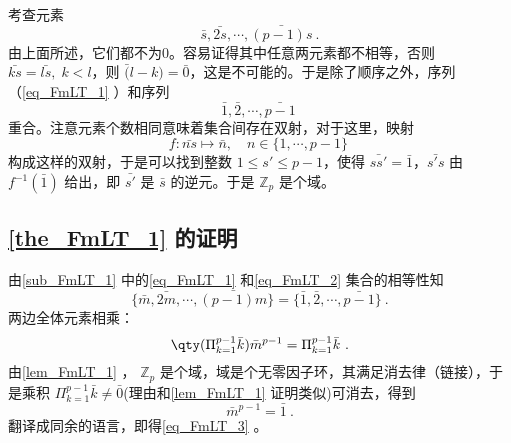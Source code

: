考查元素 
\begin{equation}\label{eq_FmLT_1}
\bar s,\bar{2s},\cdots,\bar{(p-1)s}~.
\end{equation}
由上面所述，它们都不为0。容易证得其中任意两元素都不相等，否则 $\bar {ks}=\bar{ls},\;k<l$，则 $\bar(l-k)=\bar 0$，这是不可能的。于是除了顺序之外，序列（\autoref{eq_FmLT_1} ）和序列
\begin{equation}\label{eq_FmLT_2}
\bar 1,\bar 2,\cdots,\bar{p-1}~
\end{equation}
重合。注意元素个数相同意味着集合间存在双射，对于这里，映射
\begin{equation}
f:\bar{ns}\mapsto \bar n,\quad n\in\{1,\cdots,p-1\}~
\end{equation}
构成这样的双射，于是可以找到整数 $1\leq s'\leq p-1$，使得 $\bar{ss'}=\bar 1$，$\bar{s's}$ 由 $f^{-1}(\bar 1)$ 给出，即 $\bar{s'}$ 是 $\bar s$ 的逆元。于是 $\mathbb Z_p$ 是个域。
\subsection{\autoref{the_FmLT_1} 的证明}
由\autoref{sub_FmLT_1} 中的\autoref{eq_FmLT_1} 和\autoref{eq_FmLT_2} 集合的相等性知
\begin{equation}
\{\bar m,\bar{2m},\cdots,\bar{(p-1)m}\}=\{\bar 1,\bar 2,\cdots,\bar{p-1}\}~.
\end{equation}
两边全体元素相乘：
\begin{equation}
\qty(\Pi_{k=1}^{p-1}\bar k)\bar{m}^{p-1}=\Pi_{k=1}^{p-1}\bar k~.
\end{equation}
由\autoref{lem_FmLT_1} ， $\mathbb Z_p$ 是个域，域是个无零因子环，其满足消去律（链接），于是乘积 $\Pi_{k=1}^{p-1}\bar k\neq\bar0$(理由和\autoref{lem_FmLT_1} 证明类似)可消去，得到
\begin{equation}
\bar m^{p-1}=\bar 1~.
\end{equation}
翻译成同余的语言，即得\autoref{eq_FmLT_3} 。








